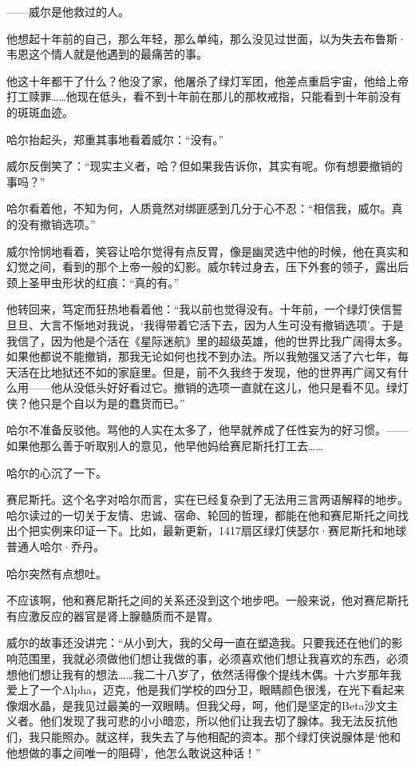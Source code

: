\documentclass[../main]{subfiles}
\begin{document}
——威尔是他救过的人。

他想起十年前的自己，那么年轻，那么单纯，那么没见过世面，以为失去布鲁斯·韦恩这个情人就是他遇到的最痛苦的事。

他这十年都干了什么？他没了家，他屠杀了绿灯军团，他差点重启宇宙，他给上帝打工赎罪……他现在低头，看不到十年前在那儿的那枚戒指，只能看到十年前没有的斑斑血迹。

哈尔抬起头，郑重其事地看着威尔：“没有。”

威尔反倒笑了：“现实主义者，哈？但如果我告诉你，其实有呢。你有想要撤销的事吗？”

哈尔看着他，不知为何，人质竟然对绑匪感到几分于心不忍：“相信我，威尔。真的没有撤销选项。”

威尔怜悯地看着，笑容让哈尔觉得有点反胃，像是幽灵选中他的时候，他在真实和幻觉之间，看到的那个上帝一般的幻影。威尔转过身去，压下外套的领子，露出后颈上圣甲虫形状的红痕：“真的有。”

他转回来，笃定而狂热地看着他：“我以前也觉得没有。十年前，一个绿灯侠信誓旦旦、大言不惭地对我说，‘我得带着它活下去，因为人生可没有撤销选项’。于是我信了，因为他是个活在《星际迷航》里的超级英雄，他的世界比我广阔得太多。如果他都说不能撤销，那我无论如何也找不到办法。所以我勉强又活了六七年，每天活在比地狱还不如的家庭里。但是，前不久我终于发现，他的世界再广阔又有什么用——他从没低头好好看过它。撤销的选项一直就在这儿，他只是看不见。绿灯侠？他只是个自以为是的蠢货而已。”

哈尔不准备反驳他。骂他的人实在太多了，他早就养成了任性妄为的好习惯。——如果他那么善于听取别人的意见，他早他妈给赛尼斯托打工去……

哈尔的心沉了一下。

赛尼斯托。这个名字对哈尔而言，实在已经复杂到了无法用三言两语解释的地步。哈尔读过的一切关于友情、忠诚、宿命、轮回的哲理，都能在他和赛尼斯托之间找出个把实例来印证一下。比如，最新更新，1417扇区绿灯侠瑟尔·赛尼斯托和地球普通人哈尔·乔丹。

哈尔突然有点想吐。

不应该啊，他和赛尼斯托之间的关系还没到这个地步吧。一般来说，他对赛尼斯托有应激反应的器官是肾上腺髓质而不是胃。

威尔的故事还没讲完：“从小到大，我的父母一直在塑造我。只要我还在他们的影响范围里，我就必须做他们想让我做的事，必须喜欢他们想让我喜欢的东西，必须想他们想让我有的想法……我二十八岁了，依然活得像个提线木偶。十六岁那年我爱上了一个Alpha，迈克，他是我们学校的四分卫，眼睛颜色很浅，在光下看起来像烟水晶，是我见过最美的一双眼睛。但我父母，呵，他们是坚定的Beta沙文主义者。他们发现了我可悲的小小暗恋，所以他们让我去切了腺体。我无法反抗他们，我只能照办。就这样，我失去了与他相配的资本。那个绿灯侠说腺体是‘他和他想做的事之间唯一的阻碍’，他怎么敢说这种话！”
\end{document}
